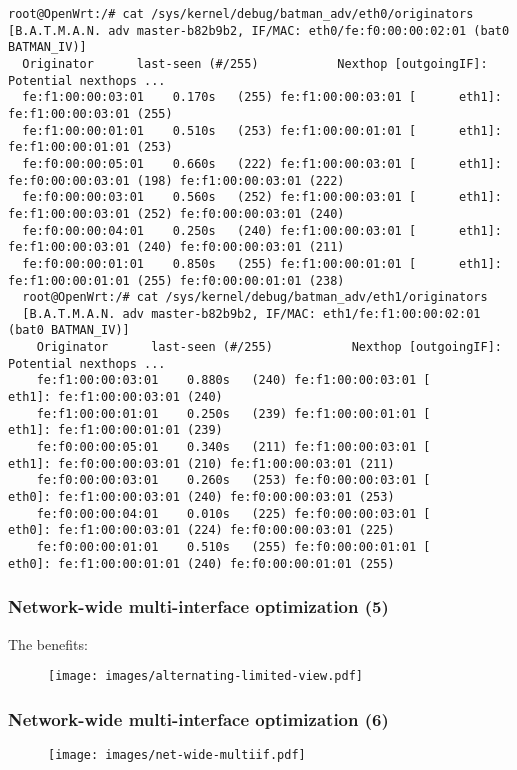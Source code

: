 \documentclass[slidestop]{beamer}
\begin{document}
\begin{frame}[c,fragile]
\begin{lstlisting}[basicstyle=\tiny]
root@OpenWrt:/# cat /sys/kernel/debug/batman_adv/eth0/originators
[B.A.T.M.A.N. adv master-b82b9b2, IF/MAC: eth0/fe:f0:00:00:02:01 (bat0 BATMAN_IV)]
  Originator      last-seen (#/255)           Nexthop [outgoingIF]:   Potential nexthops ...
  fe:f1:00:00:03:01    0.170s   (255) fe:f1:00:00:03:01 [      eth1]: fe:f1:00:00:03:01 (255)
  fe:f1:00:00:01:01    0.510s   (253) fe:f1:00:00:01:01 [      eth1]: fe:f1:00:00:01:01 (253)
  fe:f0:00:00:05:01    0.660s   (222) fe:f1:00:00:03:01 [      eth1]: fe:f0:00:00:03:01 (198) fe:f1:00:00:03:01 (222)
  fe:f0:00:00:03:01    0.560s   (252) fe:f1:00:00:03:01 [      eth1]: fe:f1:00:00:03:01 (252) fe:f0:00:00:03:01 (240)
  fe:f0:00:00:04:01    0.250s   (240) fe:f1:00:00:03:01 [      eth1]: fe:f1:00:00:03:01 (240) fe:f0:00:00:03:01 (211)
  fe:f0:00:00:01:01    0.850s   (255) fe:f1:00:00:01:01 [      eth1]: fe:f1:00:00:01:01 (255) fe:f0:00:00:01:01 (238)
  root@OpenWrt:/# cat /sys/kernel/debug/batman_adv/eth1/originators
  [B.A.T.M.A.N. adv master-b82b9b2, IF/MAC: eth1/fe:f1:00:00:02:01 (bat0 BATMAN_IV)]
    Originator      last-seen (#/255)           Nexthop [outgoingIF]:   Potential nexthops ...
    fe:f1:00:00:03:01    0.880s   (240) fe:f1:00:00:03:01 [      eth1]: fe:f1:00:00:03:01 (240)
    fe:f1:00:00:01:01    0.250s   (239) fe:f1:00:00:01:01 [      eth1]: fe:f1:00:00:01:01 (239)
    fe:f0:00:00:05:01    0.340s   (211) fe:f1:00:00:03:01 [      eth1]: fe:f0:00:00:03:01 (210) fe:f1:00:00:03:01 (211)
    fe:f0:00:00:03:01    0.260s   (253) fe:f0:00:00:03:01 [      eth0]: fe:f1:00:00:03:01 (240) fe:f0:00:00:03:01 (253)
    fe:f0:00:00:04:01    0.010s   (225) fe:f0:00:00:03:01 [      eth0]: fe:f1:00:00:03:01 (224) fe:f0:00:00:03:01 (225)
    fe:f0:00:00:01:01    0.510s   (255) fe:f0:00:00:01:01 [      eth0]: fe:f1:00:00:01:01 (240) fe:f0:00:00:01:01 (255)
	\end{lstlisting}

\end{frame}

\begin{frame}[c]
	\frametitle{Network-wide multi-interface optimization (5)}

	The benefits:
	\begin{figure}
		\centering
		\texttt{[image: images/alternating-limited-view.pdf]}
	\end{figure}
\end{frame}


\begin{frame}[c]
	\frametitle{Network-wide multi-interface optimization (6)}

	\begin{figure}
		\centering
		\texttt{[image: images/net-wide-multiif.pdf]}
	\end{figure}
\end{frame}
\end{document}
